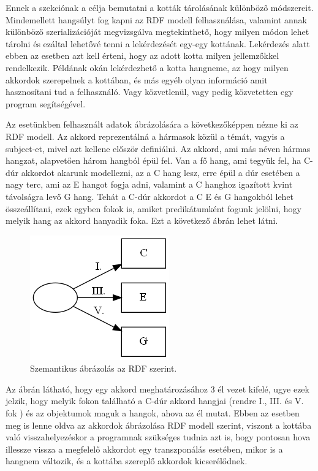 
Ennek a szekciónak a célja bemutatni a kották tárolásának különböző módszereit. Mindemellett hangsúlyt fog kapni az RDF modell felhasználása, valamint annak különböző szerializációját megvizsgálva megtekinthető, hogy milyen módon lehet tárolni és ezáltal lehetővé tenni a lekérdezését egy-egy kottának. Lekérdezés alatt ebben az esetben azt kell érteni, hogy az adott kotta milyen jellemzőkkel rendelkezik. Példának okán lekérdezhető a kotta hangneme, az hogy milyen akkordok szerepelnek a kottában, és más egyéb olyan információ amit hasznosítani tud a felhasználó. Vagy közvetlenül, vagy pedig közvetetten egy program segítségével.

Az esetünkben felhasznált adatok ábrázolására a következőképpen nézne ki az RDF modell. Az akkord reprezentálná a hármasok közül a témát, vagyis a subject-et, mivel azt kellene először definiálni. Az akkord, ami más néven hármas hangzat, alapvetően három hangból épül fel. Van a fő hang, ami tegyük fel, ha C-dúr akkordot akarunk modellezni, az a C hang lesz, erre épül a dúr esetében a nagy terc, ami az E hangot fogja adni, valamint a C hanghoz igazított kvint távolságra levő G hang. Tehát a C-dúr akkordot a C E és G hangokból lehet összeállítani, ezek egyben fokok is, amiket predikátumként fogunk jelölni, hogy melyik hang az akkord hanyadik foka. Ezt a következő ábrán lehet látni.
\par
\begin{figure}[h]
	\includegraphics[scale=1]{images/img_src/rdf_graph.png}
	\caption{Szemantikus ábrázolás az RDF szerint.}
	\label{fig:graph1}
\end{figure}
\newpage
Az ábrán látható, hogy egy akkord meghatározásához 3 él vezet kifelé, ugye ezek jelzik, hogy melyik fokon található a C-dúr akkord hangjai (rendre I., III. és V. fok ) és az objektumok maguk a hangok, ahova az él mutat. Ebben az esetben meg is lenne oldva az akkordok ábrázolása RDF modell szerint, viszont a kottába való visszahelyezéskor a programnak szükséges tudnia azt is, hogy pontosan hova illessze vissza a megfelelő akkordot egy transzponálás esetében, mikor is a hangnem változik, és a kottába szereplő akkordok kicserélődnek. 
